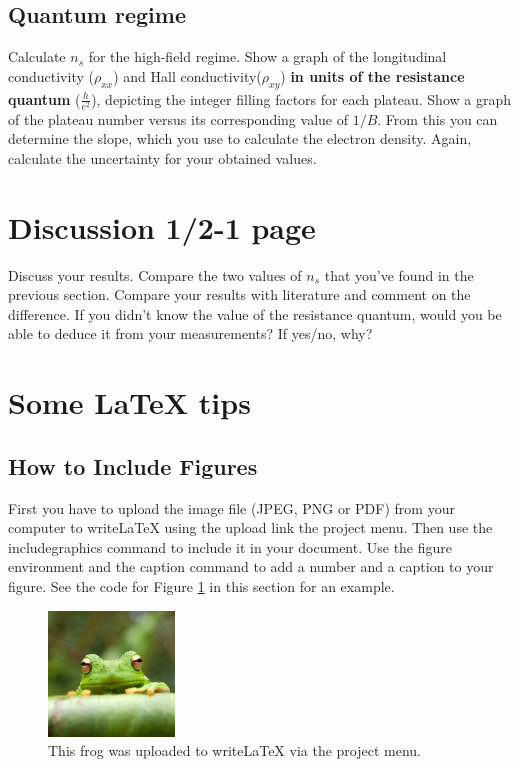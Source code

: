 \documentclass[a4paper]{article}
\begin{document}
\subsection{Quantum regime}
Calculate $n_{s}$ for the high-field regime.
Show a graph of the longitudinal conductivity ($\rho_{xx}$) and Hall conductivity($\rho_{xy}$) \textbf{in units of the resistance quantum} ($\frac{h}{e^{2}}$), depicting the integer filling factors for each plateau.
Show a graph of the plateau number versus its corresponding value of $1/B$. From this you can determine the slope, which you use to calculate the electron density.
Again, calculate the uncertainty for your obtained values.

\section{Discussion 1/2-1 page}
Discuss your results. Compare the two values of $n_{s}$ that you've found in the previous section. Compare your results with literature and comment on the difference. If you didn't know the value of the resistance quantum, would you be able to deduce it from your measurements? If yes/no, why?

\newpage
\section{Some LaTeX tips}
\label{sec:latex}
\subsection{How to Include Figures}

First you have to upload the image file (JPEG, PNG or PDF) from your computer to writeLaTeX using the upload link the project menu. Then use the includegraphics command to include it in your document. Use the figure environment and the caption command to add a number and a caption to your figure. See the code for Figure \ref{fig:frog} in this section for an example.

\begin{figure}
\centering
\includegraphics[width=0.3\textwidth]{frog.jpg}
\caption{\label{fig:frog}This frog was uploaded to writeLaTeX via the project menu.}
\end{figure}
\end{document}
